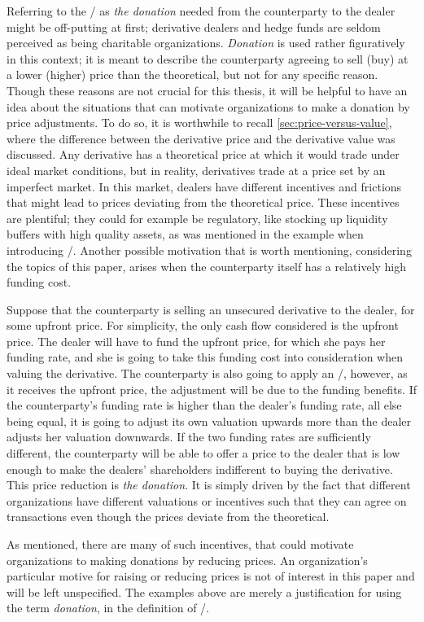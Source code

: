 \documentclass[../main.tex]{subfiles}
\begin{document}
        Referring to the \FVA/ as \textit{the donation} needed from the counterparty to the dealer
        might be off-putting at first;
        derivative dealers and hedge funds are seldom perceived as being charitable organizations.
        \textit{Donation} is used rather figuratively in this context;
        it is meant to describe the counterparty agreeing 
        to sell (buy) at a lower (higher) price than the theoretical,
        but not for any specific reason.
        Though these reasons are not crucial for this thesis,
        it will be helpful to have an idea about the situations that can motivate organizations
        to make a donation by price adjustments.
        To do so, it is worthwhile to recall \cref{sec:price-versus-value},
        where the difference between the derivative price and the derivative value was discussed.
        Any derivative has a theoretical price 
        at which it would trade under ideal market conditions,
        but in reality, derivatives trade at a price set by an imperfect market.
        In this market, dealers have different incentives and frictions
        that might lead to prices deviating from the theoretical price.
        These incentives are plentiful; they could for example be regulatory, 
        like stocking up liquidity buffers with high quality assets,
        as was mentioned in the example when introducing \FVA/.
        Another possible motivation that is worth mentioning, considering the topics of this paper,
        arises when the counterparty itself has a relatively high funding cost.

        Suppose that the counterparty is selling an unsecured derivative to the dealer, 
        for some upfront price. 
        For simplicity, the only cash flow considered is the upfront price.
        The dealer will have to fund the upfront price, for which she pays her funding rate,
        and she is going to take this funding cost into consideration when valuing the derivative.
        The counterparty is also going to apply an \FVA/, however, as it receives the upfront price,
        the adjustment will be due to the funding benefits.
        If the counterparty's funding rate is higher than the dealer's funding rate,
        all else being equal, it is going to adjust its own valuation upwards more 
        than the dealer adjusts her valuation downwards. 
        If the two funding rates are sufficiently different, 
        the counterparty will be able to offer a price to the dealer
        that is low enough to make the dealers' shareholders indifferent to buying the derivative.
        This price reduction is \textit{the donation}.
        It is simply driven by the fact that different organizations 
        have different valuations or incentives such that they can agree on transactions
        even though the prices deviate from the theoretical.

        As mentioned, there are many of such incentives, 
        that could motivate organizations to making donations by reducing prices. 
        An organization's particular motive for raising or reducing prices
        is not of interest in this paper and will be left unspecified.
        The examples above are merely a justification for using the term \textit{donation},
        in the definition of \FVA/.
\end{document}
